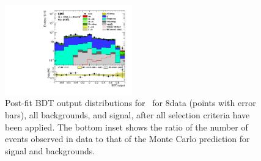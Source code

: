 \documentclass[12pt,twoside,a4paper,cmspaper,final,collab]{cms-tdr}
\begin{document}
\begin{figure}[htbp]
\centering
\includegraphics[width=0.49\textwidth]{BDT_Wtn_Wtn_PostFit_s}
  \caption{Post-fit BDT output distributions for \WtnH\ for 8\TeV data
    (points with error bars),
    all backgrounds, and signal, after all selection criteria have been
    applied. The bottom inset
      shows the ratio of the number of events observed in data to that
      of the Monte Carlo prediction for signal and backgrounds.}
    \label{fig:BDTWln8TeV_t}
\end{figure}
\end{document}
